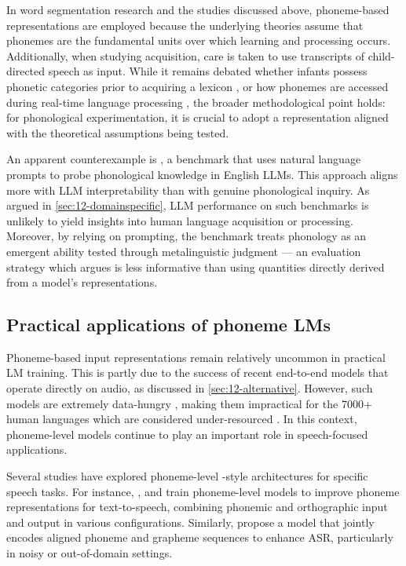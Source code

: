 In word segmentation research and the studies discussed above, phoneme-based representations are employed because the underlying theories assume that phonemes are the fundamental units over which learning and processing occurs. Additionally, when studying acquisition, care is taken to use transcripts of child-directed speech as input. While it remains debated whether infants possess phonetic categories prior to acquiring a lexicon \citep[e.g.][]{feldman_infants_2021}, or how phonemes are accessed during real-time language processing \citep[e.g.][]{mcmurray_myth_2022}, the broader methodological point holds: for phonological experimentation, it is crucial to adopt a representation aligned with the theoretical assumptions being tested.

An apparent counterexample is  \citep{suvarna-etal-2024-phonologybench}, a benchmark that uses natural language prompts to probe phonological knowledge in English LLMs. This approach aligns more with LLM interpretability than with genuine phonological inquiry. As argued in \cref{sec:12-domainspecific}, LLM performance on such benchmarks is unlikely to yield insights into human language acquisition or processing. Moreover, by relying on prompting, the benchmark treats phonology as an emergent ability tested through metalinguistic judgment --- an evaluation strategy which \citet{hu2023prompting} argues is less informative than using quantities directly derived from a model's representations. 

\subsection{Practical applications of phoneme LMs}\label{sec:12-practicalphoneme}

Phoneme-based input representations remain relatively uncommon in practical LM training. This is partly due to the success of recent end-to-end models that operate directly on audio, as discussed in \cref{sec:12-alternative}. However, such models are extremely data-hungry \citep{li2022recent}, making them impractical for the 7000+ human languages which are considered under-resourced \citep{scharenborg2020speech}. In this context, phoneme-level models continue to play an important role in speech-focused applications.

Several studies have explored phoneme-level \bert-style architectures for specific speech tasks. For instance, \citet{jia2021png},  \citet{zhang2022mixed} and \citet{li-2023-phoneme-level-bert} train phoneme-level models to improve phoneme representations for text-to-speech, combining phonemic and orthographic input and output in various configurations. Similarly, \citet{sundararaman-2021-phonemebert} propose a \bert model that jointly encodes aligned phoneme and grapheme sequences to enhance ASR, particularly in noisy or out-of-domain settings.

